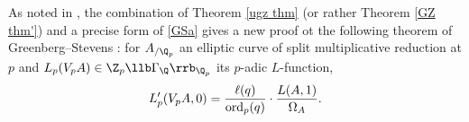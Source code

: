 \begin{rema}
\notready {}
As noted in \cite{dd-exc,nonsplit}, the combination of Theorem \ref{ugz thm} (or rather Theorem \ref{GZ thm'}) and a precise form of \eqref{GSa} gives a new proof ot the following  theorem of Greenberg--Stevens \cite{GS}: for $A_{/\Q_{p}}$ an elliptic curve of split multiplicative reduction at $p$ and $L_{p}(V_{p}A)\in \Z_{p}\llb \Gamma_{\Q}\rrb_{\Q_{p}}$ its $p$-adic $L$-function,    $$L_{p}'(V_{p}A, 0)= {\ell(q)\over{\rm ord}_{p}(q)} \cdot {L(A, 1)\over \Omega_{A}}.$$
\end{rema}


















\appendix
